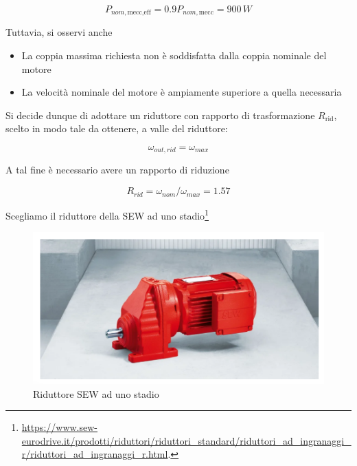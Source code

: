 \documentclass[a4paper,12pt]{article}
\begin{document}
\[
    P_{nom, \text{mecc,eff}} = 0.9 P_{nom, \text{mecc}}=900\,W
\]

\vspace{0.5cm}

Tuttavia, si osservi anche

\begin{itemize}
    \item La coppia massima richiesta non è soddisfatta dalla coppia nominale del motore
    \item La velocità nominale del motore è ampiamente superiore a quella necessaria
\end{itemize}

\vspace{0.5cm}

Si decide dunque di adottare un riduttore con rapporto di trasformazione \( R_{\text{rid}} \), scelto in modo tale da ottenere, a valle del riduttore:

\[
    \omega_{out,rid} = \omega_{max}
\]

\vspace{0.5cm}
A tal fine è necessario avere un rapporto di riduzione 

\[
    R_{rid} = \omega_{nom} / \omega_{max}  = 1.57
\]

\vspace{0.5cm}

Scegliamo il riduttore della SEW ad uno stadio\footnote{\url{https://www.sew-eurodrive.it/prodotti/riduttori/riduttori_standard/riduttori_ad_ingranaggi_r/riduttori_ad_ingranaggi_r.html}.}

\begin{figure}[h!]
    \centering
    \includegraphics[scale=0.6]{Immagini/Altre/riduttore.PNG}
    \caption{Riduttore SEW ad uno stadio}
    \label{fig: riduttore SEW}
\end{figure}

\vspace{0.5cm}
\end{document}
